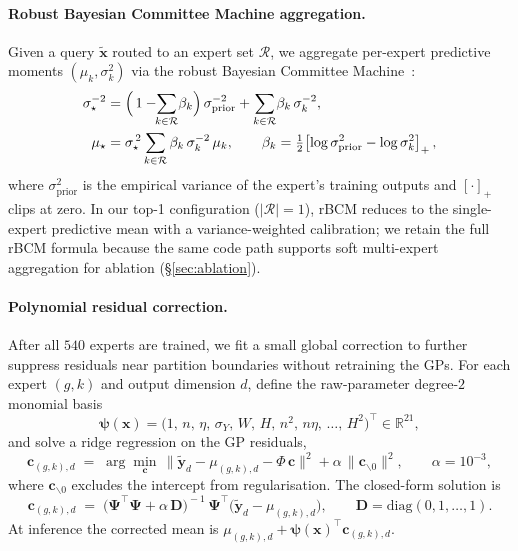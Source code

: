 \paragraph{Robust Bayesian Committee Machine aggregation.}
Given a query $\tilde{\mathbf{x}}$ routed to an expert set
$\mathcal{R}$, we aggregate per-expert predictive moments
$(\mu_k, \sigma_k^{2})$ via the robust Bayesian Committee
Machine~\cite{deisenroth2015distributed}:
\begin{align}
\label{eq:rbcm}
    \sigma_\star^{-2}
    &= \Bigl(\,1 - \!\!\sum_{k\in\mathcal{R}}\! \beta_k\Bigr)\,
        \sigma_{\mathrm{prior}}^{-2}
       + \sum_{k\in\mathcal{R}}\! \beta_k\,\sigma_k^{-2},
\nonumber\\
    \mu_\star
    &= \sigma_\star^{\,2}\sum_{k\in\mathcal{R}}
       \beta_k\,\sigma_k^{-2}\,\mu_k,
    \qquad
    \beta_k = \tfrac{1}{2}\!\left[\log\sigma_{\mathrm{prior}}^{2}
                                  - \log\sigma_k^{2}\right]_{+},
\end{align}
where $\sigma_{\mathrm{prior}}^{2}$ is the empirical variance of the
expert's training outputs and $[\cdot]_{+}$ clips at zero. In our
top-1 configuration ($|\mathcal{R}| = 1$), rBCM reduces to the
single-expert predictive mean with a variance-weighted calibration;
we retain the full rBCM formula because the same code path supports
soft multi-expert aggregation for ablation
(\S\ref{sec:ablation}).

\paragraph{Polynomial residual correction.}
After all $540$ experts are trained, we fit a small global correction
to further suppress residuals near partition boundaries without
retraining the GPs. For each expert $(g, k)$ and output dimension
$d$, define the raw-parameter degree-$2$ monomial basis
\begin{equation}
    \boldsymbol{\psi}(\mathbf{x})
    = \bigl(1,\,n,\,\eta,\,\sigma_Y,\,W,\,H,\,
      n^{2},\,n\eta,\,\ldots,\,H^{2}\bigr)^{\!\top}
      \in \mathbb{R}^{21},
\end{equation}
and solve a ridge regression on the GP residuals,
\begin{equation}
\label{eq:poly}
    \mathbf{c}_{(g,k),d}
    \;=\; \arg\min_{\mathbf{c}}\,
    \bigl\|\tilde{\mathbf{y}}_{d} - \mu_{(g,k),d} - \Phi\,\mathbf{c}\bigr\|^{2}
    + \alpha\,\|\mathbf{c}_{\backslash 0}\|^{2},
    \qquad \alpha = 10^{-3},
\end{equation}
where $\mathbf{c}_{\backslash 0}$ excludes the intercept from
regularisation. The closed-form solution is
\begin{equation}
\label{eq:poly-closed}
    \mathbf{c}_{(g,k),d}
    \;=\;
    \bigl(\boldsymbol{\Psi}^{\!\top}\boldsymbol{\Psi} + \alpha\,\mathbf{D}\bigr)^{\!-1}\,
    \boldsymbol{\Psi}^{\!\top}\!\bigl(\tilde{\mathbf{y}}_{d} - \mu_{(g,k),d}\bigr),
    \qquad
    \mathbf{D} = \mathrm{diag}(0, 1, \dots, 1).
\end{equation}
At inference the corrected mean is
$\mu_{(g,k),d} + \boldsymbol{\psi}(\mathbf{x})^{\!\top}\mathbf{c}_{(g,k),d}$.

